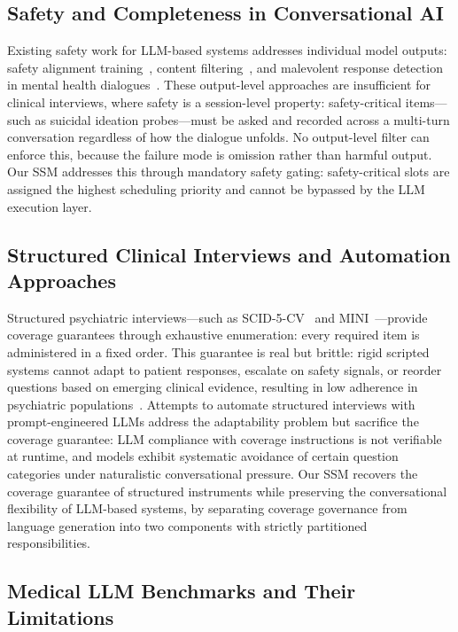 \documentclass[conference]{IEEEtran}
\begin{document}
\subsection{Safety and Completeness in Conversational AI}

Existing safety work for LLM-based systems addresses individual model outputs: safety alignment training~\cite{ouyang2022training}, content filtering~\cite{gehman2020realtoxicity}, and malevolent response detection in mental health dialogues~\cite{xu2024malevolence}. These output-level approaches are insufficient for clinical interviews, where safety is a session-level property: safety-critical items---such as suicidal ideation probes---must be asked and recorded across a multi-turn conversation regardless of how the dialogue unfolds. No output-level filter can enforce this, because the failure mode is omission rather than harmful output. Our SSM addresses this through mandatory safety gating: safety-critical slots are assigned the highest scheduling priority and cannot be bypassed by the LLM execution layer.

\subsection{Structured Clinical Interviews and Automation Approaches}

Structured psychiatric interviews---such as SCID-5-CV~\cite{first2015structured} and MINI~\cite{sheehan1998mini}---provide coverage guarantees through exhaustive enumeration: every required item is administered in a fixed order. This guarantee is real but brittle: rigid scripted systems cannot adapt to patient responses, escalate on safety signals, or reorder questions based on emerging clinical evidence, resulting in low adherence in psychiatric populations~\cite{torous2020dropout}. Attempts to automate structured interviews with prompt-engineered LLMs address the adaptability problem but sacrifice the coverage guarantee: LLM compliance with coverage instructions is not verifiable at runtime, and models exhibit systematic avoidance of certain question categories under naturalistic conversational pressure. Our SSM recovers the coverage guarantee of structured instruments while preserving the conversational flexibility of LLM-based systems, by separating coverage governance from language generation into two components with strictly partitioned responsibilities.

\subsection{Medical LLM Benchmarks and Their Limitations}
\end{document}
